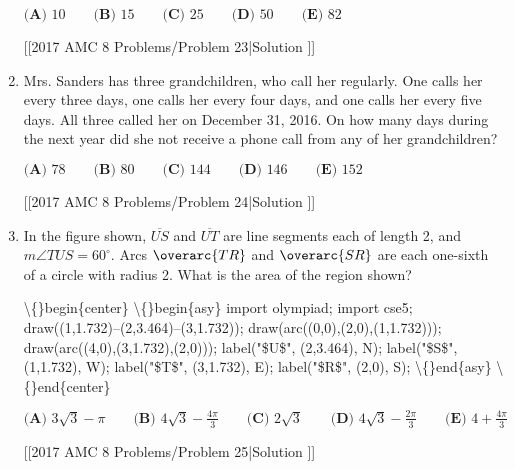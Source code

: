 \documentclass{article}
\begin{document}
\begin{enumerate}[label=\arabic*., itemsep=0.5em]
\(\textbf{(A) }10\qquad\textbf{(B) }15\qquad\textbf{(C) }25\qquad\textbf{(D) }50\qquad\textbf{(E) }82\)

[[2017 AMC 8 Problems/Problem 23|Solution
]]\par \vspace{0.5em}\item Mrs. Sanders has three grandchildren, who call her regularly. One calls her every three days, one calls her every four days, and one calls her every five days. All three called her on December 31, 2016. On how many days during the next year did she not receive a phone call from any of her grandchildren?

\(\textbf{(A) }78\qquad\textbf{(B) }80\qquad\textbf{(C) }144\qquad\textbf{(D) }146\qquad\textbf{(E) }152\)

[[2017 AMC 8 Problems/Problem 24|Solution
]]\par \vspace{0.5em}\item In the figure shown, \(\overline{US}\) and \(\overline{UT}\) are line segments each of length 2, and \(m\angle TUS = 60^\circ\). Arcs \(\overarc{TR}\) and \(\overarc{SR}\) are each one-sixth of a circle with radius 2. What is the area of the region shown?


\textbackslash\{\}begin\{center\}
\textbackslash\{\}begin\{asy\}
import olympiad;
import cse5;
draw((1,1.732)--(2,3.464)--(3,1.732)); draw(arc((0,0),(2,0),(1,1.732))); draw(arc((4,0),(3,1.732),(2,0))); label("\$U\$", (2,3.464), N); label("\$S\$", (1,1.732), W); label("\$T\$", (3,1.732), E); label("\$R\$", (2,0), S);
\textbackslash\{\}end\{asy\}
\textbackslash\{\}end\{center\}

\(\textbf{(A) }3\sqrt{3}-\pi\qquad\textbf{(B) }4\sqrt{3}-\frac{4\pi}{3}\qquad\textbf{(C) }2\sqrt{3}\qquad\textbf{(D) }4\sqrt{3}-\frac{2\pi}{3}\qquad\textbf{(E) }4+\frac{4\pi}{3}\)

[[2017 AMC 8 Problems/Problem 25|Solution
]]\par \vspace{0.5em}\end{enumerate}
\end{document}
